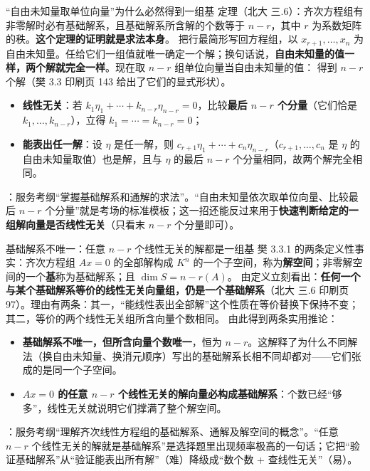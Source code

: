 \begin{fdeep}{“自由未知量取单位向量”为什么必然得到一组基}
定理（北大 三.6）：齐次方程组有非零解时必有基础解系，且基础解系所含解的个数等于 $n-r$，其中 $r$ 为系数矩阵的秩。\textbf{这个定理的证明就是求法本身}。
把行最简形写回方程组，以 $x_{r+1},\dots,x_n$ 为自由未知量。任给它们一组值就唯一确定一个解；换句话说，\textbf{自由未知量的值一样，两个解就完全一样}。现在取 $n-r$ 组单位向量当自由未知量的值：
得到 $n-r$ 个解（樊 3.3 印刷页 143 给出了它们的显式形状）。
\begin{itemize}[leftmargin=2.2em,itemsep=0.25em]
\item \textbf{线性无关}：若 $k_1\eta_1+\cdots+k_{n-r}\eta_{n-r}=0$，比较\textbf{最后 $n-r$ 个分量}（它们恰是 $k_1,\dots,k_{n-r}$），立得 $k_1=\cdots=k_{n-r}=0$；
\item \textbf{能表出任一解}：设 $\eta$ 是任一解，则 $c_{r+1}\eta_1+\cdots+c_n\eta_{n-r}$（$c_{r+1},\dots,c_n$ 是 $\eta$ 的自由未知量取值）也是解，且与 $\eta$ 的最后 $n-r$ 个分量相同，故两个解完全相同。
\end{itemize}
\fbref{}：服务考纲“掌握基础解系和通解的求法”。“自由未知量依次取单位向量、比较最后 $n-r$ 个分量”就是考场的标准模板；这一招还能反过来用于\textbf{快速判断给定的一组解向量是否线性无关}（只看末 $n-r$ 个分量即可）。
\end{fdeep}

\begin{fdeep}{基础解系不唯一：任意 $n-r$ 个线性无关的解都是一组基}
樊 3.3.1 的两条定义性事实：齐次方程组 $Ax=0$ 的全部解构成 $K^n$ 的一个子空间，称为\textbf{解空间}；非零解空间的一个\textbf{基}称为基础解系；且 $\dim S=n-r(A)$。
由定义立刻看出：\textbf{任何一个与某个基础解系等价的线性无关向量组，仍是一个基础解系}（北大 三.6 印刷页 97）。理由有两条：其一，“能线性表出全部解”这个性质在等价替换下保持不变；其二，等价的两个线性无关组所含向量个数相同。
由此得到两条实用推论：
\begin{itemize}[leftmargin=2.2em,itemsep=0.25em]
\item \textbf{基础解系不唯一，但所含向量个数唯一}，恒为 $n-r$。这解释了为什么不同解法（换自由未知量、换消元顺序）写出的基础解系长相不同却都对——它们张成的是同一个子空间。
\item \textbf{$Ax=0$ 的任意 $n-r$ 个线性无关的解向量必构成基础解系}：个数已经“够多”，线性无关就说明它们撑满了整个解空间。
\end{itemize}
\fbref{}：服务考纲“理解齐次线性方程组的基础解系、通解及解空间的概念”。“任意 $n-r$ 个线性无关的解就是基础解系”是选择题里出现频率极高的一句话；它把“验证基础解系”从“验证能表出所有解”（难）降级成“数个数 + 查线性无关”（易）。
\end{fdeep}


